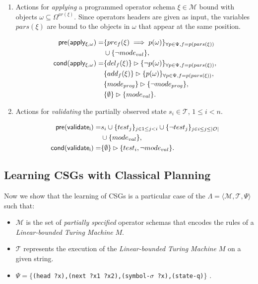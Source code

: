 \documentclass[letterpaper]{article} %
\newcommand{\tup}[1]{{\langle #1 \rangle}}
\newcommand{\pre}{\mathsf{pre}}     %
\newcommand{\cond}{\mathsf{cond}}   %
\begin{document}
\begin{itemize}
\begin{enumerate}
\item Actions for {\em applying} a programmed operator schema $\xi\in\mathcal{M}$ bound with objects $\omega\subseteq\Omega^{ar(\xi)}$. Since operators headers are given as input, the variables $pars(\xi)$ are bound to the objects in $\omega$ that appear at the same position. 
\begin{small}
\begin{align*}
\hspace*{7pt}\pre(\mathsf{apply_{\xi,\omega}})=&\{pre_{f}(\xi)\implies p(\omega)\}_{\forall p\in\Psi,f=p(pars(\xi))}\\
&\cup \{\neg mode_{val}\},\\
\cond(\mathsf{apply_{\xi,\omega}})=&\{del_{f}(\xi)\}\rhd\{\neg p(\omega)\}_{\forall p\in\Psi,f=p(pars(\xi))},\\
&\{add_{f}(\xi)\}\rhd\{p(\omega)\}_{\forall p\in\Psi,f=p(pars(\xi))},\\
&\{mode_{prog}\}\rhd\{\neg mode_{prog}\},\\
&\{\emptyset\}\rhd\{mode_{val}\}.
\end{align*}
\end{small}

\item Actions for {\em validating} the partially observed state $s_i\in\mathcal{T}$, {\tt\small $1\leq i< n$}.
\begin{small}
\begin{align*}
\hspace*{7pt}\pre(\mathsf{validate_{i}})=&s_i\cup\{test_j\}_{j\in 1\leq j<i}\cup\{\neg test_j\}_{j\in i\leq j\leq |\mathcal{O}|}\\
& \cup \{mode_{val}\},\\
\cond(\mathsf{validate_{i}})=&\{\emptyset\}\rhd\{test_i,\neg mode_{val}\}.
\end{align*}
\end{small}
\end{enumerate}
\end{itemize}

\subsection{Learning CSGs with Classical Planning}
Now we show that the learning of CSGs is a particular case of the $\Lambda=\tup{\mathcal{M},\mathcal{T},\Psi}$ such that:
\begin{itemize}
\item $\mathcal{M}$ is the set of {\em partially specified} operator schemas that encodes the rules of a {\em Linear-bounded Turing Machine} $M$.
\item $\mathcal{T}$ represents the execution of the {\em Linear-bounded Turing Machine} $M$ on a given string.
\item $\Psi=\{${\tt(head ?x),(next ?x1 ?x2),(symbol-$\sigma$ ?x),(state-q)}$\}$ . 
\end{itemize}
\end{document}
